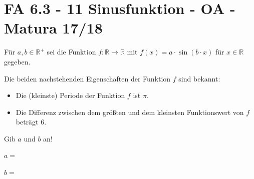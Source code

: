 \section{FA 6.3 - 11 Sinusfunktion - OA - Matura 17/18}

\begin{beispiel}[FA 6.3]{1} %
Für $a,b\in\mathbb{R}^+$ sei die Funktion $f: \mathbb{R}\rightarrow\mathbb{R}$ mit $f(x)=a\cdot\sin(b\cdot x)$ für $x\in\mathbb{R}$ gegeben.

Die beiden nachstehenden Eigenschaften der Funktion $f$ sind bekannt:
\begin{itemize}
	\item Die (kleinste) Periode der Funktion $f$ ist $\pi$.
	\item Die Differenz zwischen dem größten und dem kleinsten Funktionswert von $f$ beträgt 6.
\end{itemize}

Gib $a$ und $b$ an!\leer

$a=$\,\leer

$b=$\,
\end{beispiel}